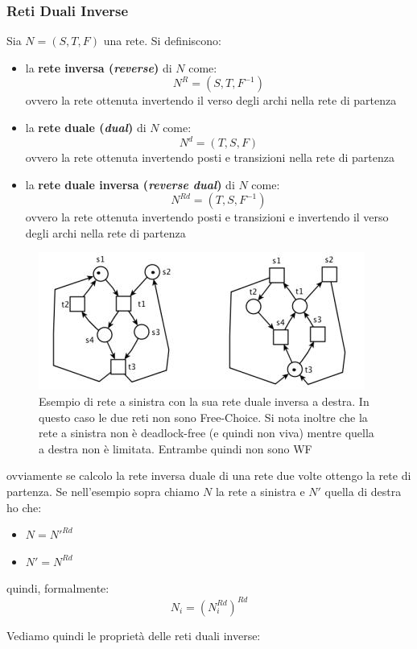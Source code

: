 \documentclass[a4paper,12pt, oneside]{book}
\begin{document}
\subsubsection{Reti Duali Inverse}
\begin{definizione}
  Sia $N = (S, T , F )$ una rete. Si definiscono:
  \begin{itemize}
    \item la \textbf{rete inversa (\textit{reverse})} di $N$ come:
    \[N^R=(S,T,F^{-1})\]
    ovvero la rete ottenuta invertendo il verso degli archi nella rete di
    partenza 
    \item la \textbf{rete duale (\textit{dual})} di $N$ come:
    \[N^d=(T,S,F)\]
    ovvero la rete ottenuta invertendo posti e transizioni nella rete di
    partenza 
    \item la \textbf{rete duale inversa (\textit{reverse dual})} di $N$ come:
    \[N^{Rd}=(T,S,F^{-1})\]
    ovvero la rete ottenuta invertendo posti e transizioni e invertendo il
    verso degli archi nella rete di partenza 
  \end{itemize}
  \begin{figure}[H]
    \centering
    \includegraphics[scale = 0.65]{img/rd.jpg}
    \caption{Esempio di rete a sinistra con la sua rete duale inversa a
      destra. In questo caso le due reti non sono Free-Choice. Si nota inoltre
      che la rete a sinistra non è deadlock-free (e quindi non viva) mentre
      quella a destra non è limitata. Entrambe quindi non sono WF}
  \end{figure}
  ovviamente se calcolo la rete inversa duale di una rete due volte ottengo la
  rete di partenza. Se nell'esempio sopra chiamo $N$ la rete a sinistra e $N'$
  quella di destra ho che:
  \begin{itemize}
    \item $N=N'^{Rd}$
    \item $N'=N^{Rd}$
  \end{itemize}
  quindi, formalmente:
  \[N_i=(N_i^{Rd})^{Rd}\]
\end{definizione}
Vediamo quindi le proprietà delle reti duali inverse:
\end{document}
